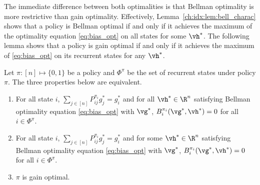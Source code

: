 The immediate difference between both optimalities is that Bellman optimality is more restrictive than gain optimality.
Effectively, Lemma~\ref{ch:idx:lem:bell_charac} shows that a policy is Bellman optimal if and only if it achieves the maximum of the optimality equation \eqref{eq:bias_opt} on all states for some $\vh^*$.
The following lemma shows that a policy is gain optimal if and only if it achieves the maximum of \eqref{eq:bias_opt} on its recurrent states for any $\vh^*$.
\begin{lem}
    \label{ch:idx:lem:opt_pol}
    Let $\pi:[n]\mapsto\{0,1\}$ be a policy and $\Phi^\pi$ be the set of recurrent states under policy $\pi$.
    The three properties below are equivalent.
    \begin{enumerate}[label=(\roman*)]
        \item \label{it:opt_pol1} For all state $i$, $\sum_{j\in[n]}P^{\pi_i}_{ij}g^*_j=g^*_i$ and for all $\vh^*\in \R^{n}$ satisfying Bellman optimality equation \eqref{eq:bias_opt} with $\vg^*$, $B^{\pi_i}_i(\vg^*,\vh^*)=0$ for all $i\in\Phi^\pi$.
        \item \label{it:opt_pol2} For all state $i$, $\sum_{j\in[n]}P^{\pi_i}_{ij}g^*_j=g^*_i$ and for some $\vh^*\in \R^{n}$ satisfying Bellman optimality equation \eqref{eq:bias_opt} with $\vg^*$, $B^{\pi_i}_i(\vg^*,\vh^*)=0$ for all $i\in\Phi^\pi$.
        \item \label{it:opt_pol3} $\pi$ is gain optimal.
    \end{enumerate}
\end{lem}
